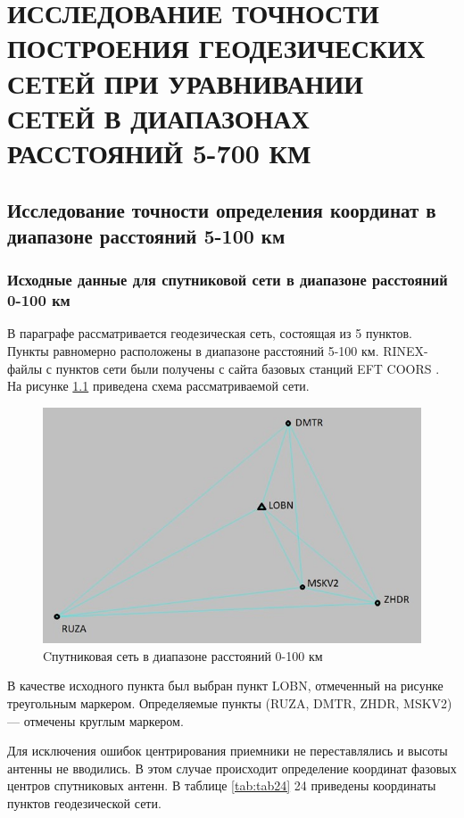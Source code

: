 \chapter{ИССЛЕДОВАНИЕ ТОЧНОСТИ ПОСТРОЕНИЯ ГЕОДЕЗИЧЕСКИХ СЕТЕЙ ПРИ УРАВНИВАНИИ СЕТЕЙ В ДИАПАЗОНАХ РАССТОЯНИЙ 5-700 КМ}\label{ch:ch3}

\section{Исследование точности определения координат в диапазоне расстояний 5-100 км}\label{sec:ch3/sect1}

\subsection{Исходные данные для спутниковой сети в диапазоне расстояний 0-100 км}\label{subsec:ch2/sec3/sub5}

В параграфе рассматривается геодезическая сеть, состоящая из 5 пунктов. Пункты равномерно расположены в диапазоне расстояний 5-100 км. RINEX-файлы с пунктов сети были получены с сайта базовых станций EFT COORS \cite{src55}. На рисунке \cref{fig:pic25}  приведена схема рассматриваемой сети.


\begin{figure}[!h]
	\centering
	\includegraphics[width=0.99\linewidth]{images/pic25}
	\caption{Cпутниковая сеть в диапазоне расстояний 0-100 км }
	\label{fig:pic25}
\end{figure}

В качестве исходного пункта был выбран пункт LOBN, отмеченный на рисунке треугольным маркером. Определяемые пункты (RUZA, DMTR, ZHDR, MSKV2) --- отмечены круглым маркером.

Для исключения ошибок центрирования приемники не переставлялись и высоты антенны не вводились. В этом случае происходит определение координат фазовых центров спутниковых антенн. В таблице \cref{tab:tab24} 24 приведены координаты пунктов геодезической сети.

